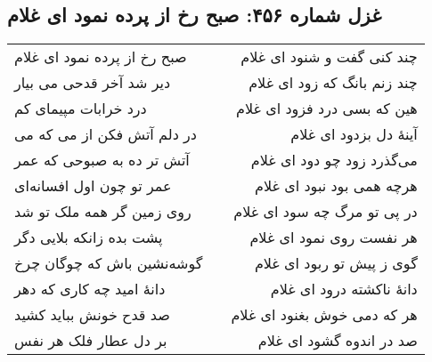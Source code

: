 \begin{center}
\section*{غزل شماره ۴۵۶: صبح رخ از پرده نمود ای غلام}
\label{sec:456}
\begin{longtable}{l p{0.5cm} r}
صبح رخ از پرده نمود ای غلام
&&
چند کنی گفت و شنود ای غلام
\\
دیر شد آخر قدحی می بیار
&&
چند زنم بانگ که زود ای غلام
\\
درد خرابات مپیمای کم
&&
هین که بسی درد فزود ای غلام
\\
در دلم آتش فکن از می که می
&&
آینهٔ دل بزدود ای غلام
\\
آتش تر ده به صبوحی که عمر
&&
می‌گذرد زود چو دود ای غلام
\\
عمر تو چون اول افسانه‌ای
&&
هرچه همی بود نبود ای غلام
\\
روی زمین گر همه ملک تو شد
&&
در پی تو مرگ چه سود ای غلام
\\
پشت بده زانکه بلایی دگر
&&
هر نفست روی نمود ای غلام
\\
گوشه‌نشین باش که چوگان چرخ
&&
گوی ز پیش تو ربود ای غلام
\\
دانهٔ امید چه کاری که دهر
&&
دانهٔ ناکشته درود ای غلام
\\
صد قدح خونش بباید کشید
&&
هر که دمی خوش بغنود ای غلام
\\
بر دل عطار فلک هر نفس
&&
صد در اندوه گشود ای غلام
\\
\end{longtable}
\end{center}
